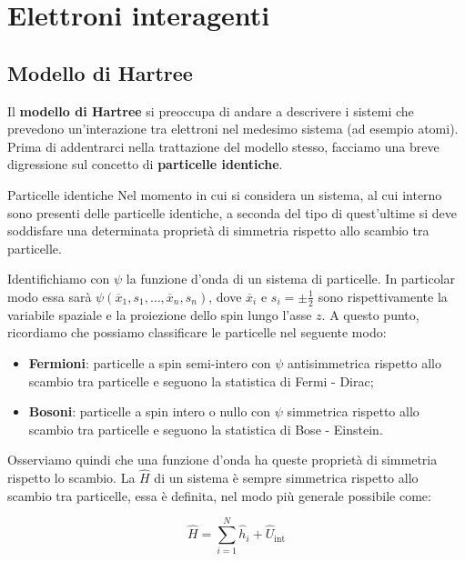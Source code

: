 \chapter{Elettroni interagenti}

\section{Modello di Hartree}

Il \textbf{modello di Hartree} si preoccupa di andare a descrivere i sistemi che prevedono un'interazione tra elettroni nel medesimo sistema (ad esempio atomi). Prima di addentrarci nella trattazione del modello stesso, facciamo una breve digressione sul concetto di \textbf{particelle identiche}.

\begin{definition}{Particelle identiche}
    Nel momento in cui si considera un sistema, al cui interno sono presenti delle particelle identiche, a seconda del tipo di quest'ultime si deve soddisfare una determinata proprietà di simmetria rispetto allo scambio tra particelle.
\end{definition}

\noindent Identifichiamo con $\psi$ la funzione d'onda di un sistema di particelle. In particolar modo essa sarà $\psi(\overline{x}_1, s_1, \dots, \overline{x}_n, s_n)$, dove $\overline x_i$ e $s_i=\pm \frac 12$ sono rispettivamente la variabile spaziale e la proiezione dello spin lungo l'asse $z$. A questo punto, ricordiamo che possiamo classificare le particelle nel seguente modo:
\begin{itemize}
    \item \textbf{Fermioni}: particelle a spin semi-intero con $\psi$ antisimmetrica rispetto allo scambio tra particelle e seguono la statistica di Fermi - Dirac;
    \item \textbf{Bosoni}: particelle a spin intero o nullo con $\psi$ simmetrica rispetto allo scambio tra particelle e seguono la statistica di Bose - Einstein.
\end{itemize}

\noindent Osserviamo quindi che una funzione d'onda ha queste proprietà di simmetria rispetto lo scambio. La $\hat H$ di un sistema è sempre simmetrica rispetto allo scambio tra particelle, essa è definita, nel modo più generale possibile come:

\begin{equation*}
    \hat H = \sum_{i=1}^N \hat h_i + \hat U_{\text{int}}
\end{equation*}

